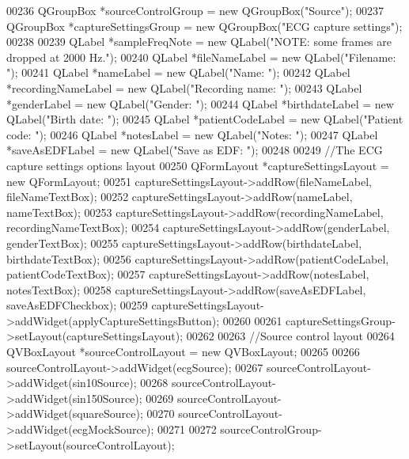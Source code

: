 \begin{DoxyCode}
00236     QGroupBox *sourceControlGroup = \textcolor{keyword}{new} QGroupBox(\textcolor{stringliteral}{"Source"});
00237     QGroupBox *captureSettingsGroup = \textcolor{keyword}{new} QGroupBox(\textcolor{stringliteral}{"ECG capture settings"});
00238 
00239     QLabel *sampleFreqNote = \textcolor{keyword}{new} QLabel(\textcolor{stringliteral}{"NOTE: some frames are dropped at 2000 Hz."});
00240     QLabel *fileNameLabel = \textcolor{keyword}{new} QLabel(\textcolor{stringliteral}{"Filename: "});
00241     QLabel *nameLabel = \textcolor{keyword}{new} QLabel(\textcolor{stringliteral}{"Name: "});
00242     QLabel *recordingNameLabel = \textcolor{keyword}{new} QLabel(\textcolor{stringliteral}{"Recording name: "});
00243     QLabel *genderLabel = \textcolor{keyword}{new} QLabel(\textcolor{stringliteral}{"Gender: "});
00244     QLabel *birthdateLabel = \textcolor{keyword}{new} QLabel(\textcolor{stringliteral}{"Birth date: "});
00245     QLabel *patientCodeLabel = \textcolor{keyword}{new} QLabel(\textcolor{stringliteral}{"Patient code: "});
00246     QLabel *notesLabel = \textcolor{keyword}{new} QLabel(\textcolor{stringliteral}{"Notes: "});
00247     QLabel *saveAsEDFLabel = \textcolor{keyword}{new} QLabel(\textcolor{stringliteral}{"Save as EDF: "});
00248 
00249     \textcolor{comment}{//The ECG capture settings options layout}
00250     QFormLayout *captureSettingsLayout = \textcolor{keyword}{new} QFormLayout;
00251     captureSettingsLayout->addRow(fileNameLabel, fileNameTextBox);
00252     captureSettingsLayout->addRow(nameLabel, nameTextBox);
00253     captureSettingsLayout->addRow(recordingNameLabel, recordingNameTextBox);
00254     captureSettingsLayout->addRow(genderLabel, genderTextBox);
00255     captureSettingsLayout->addRow(birthdateLabel, birthdateTextBox);
00256     captureSettingsLayout->addRow(patientCodeLabel, patientCodeTextBox);
00257     captureSettingsLayout->addRow(notesLabel, notesTextBox);
00258     captureSettingsLayout->addRow(saveAsEDFLabel, saveAsEDFCheckbox);
00259     captureSettingsLayout->addWidget(applyCaptureSettingsButton);
00260 
00261     captureSettingsGroup->setLayout(captureSettingsLayout);
00262 
00263     \textcolor{comment}{//Source control layout}
00264     QVBoxLayout *sourceControlLayout = \textcolor{keyword}{new} QVBoxLayout;
00265 
00266     sourceControlLayout->addWidget(ecgSource);
00267     sourceControlLayout->addWidget(sin10Source);
00268     sourceControlLayout->addWidget(sin150Source);
00269     sourceControlLayout->addWidget(squareSource);
00270     sourceControlLayout->addWidget(ecgMockSource);
00271 
00272     sourceControlGroup->setLayout(sourceControlLayout);

\end{DoxyCode}

